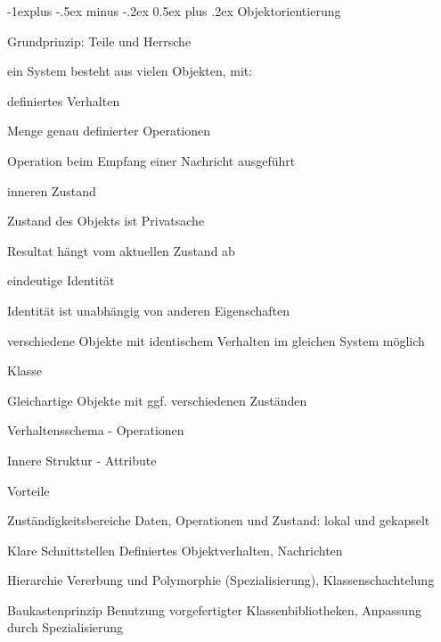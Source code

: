 \documentclass[a4paper]{article}
\makeatletter
\renewcommand{\subsection}{\@startsection{subsection}{2}{0mm}%
                                {-1explus -.5ex minus -.2ex}%
                                {0.5ex plus .2ex}%
                                {\normalfont\normalsize\bfseries}}
\makeatother
\begin{document}
\begin{multicols}{3}
  \subsection{Objektorientierung}
  \begin{itemize*}
    \item Grundprinzip: Teile und Herrsche
    \item ein System besteht aus vielen Objekten, mit:
    \begin{itemize*}
      \item definiertes Verhalten
      \begin{itemize*}
        \item Menge genau definierter Operationen
        \item Operation beim Empfang einer Nachricht ausgeführt
      \end{itemize*}
      \item inneren Zustand
      \begin{itemize*}
        \item Zustand des Objekts ist Privatsache
        \item Resultat hängt vom aktuellen Zustand ab
      \end{itemize*}
      \item eindeutige Identität
      \begin{itemize*}
        \item Identität ist unabhängig von anderen Eigenschaften
        \item verschiedene Objekte mit identischem Verhalten im gleichen System möglich
      \end{itemize*}
    \end{itemize*}
    \item Klasse
    \begin{itemize*}
      \item Gleichartige Objekte mit ggf. verschiedenen Zuständen
      \item Verhaltensschema - Operationen
      \item Innere Struktur - Attribute
    \end{itemize*}
    \item Vorteile
    \begin{description*}
      \item[Zuständigkeitsbereiche] Daten, Operationen und Zustand: lokal und gekapselt
      \item[Klare Schnittstellen] Definiertes Objektverhalten, Nachrichten
      \item[Hierarchie] Vererbung und Polymorphie (Spezialisierung), Klassenschachtelung
      \item[Baukastenprinzip] Benutzung vorgefertigter Klassenbibliotheken, Anpassung durch Spezialisierung
    \end{description*}
  \end{itemize*}


\end{multicols}
\end{document}
